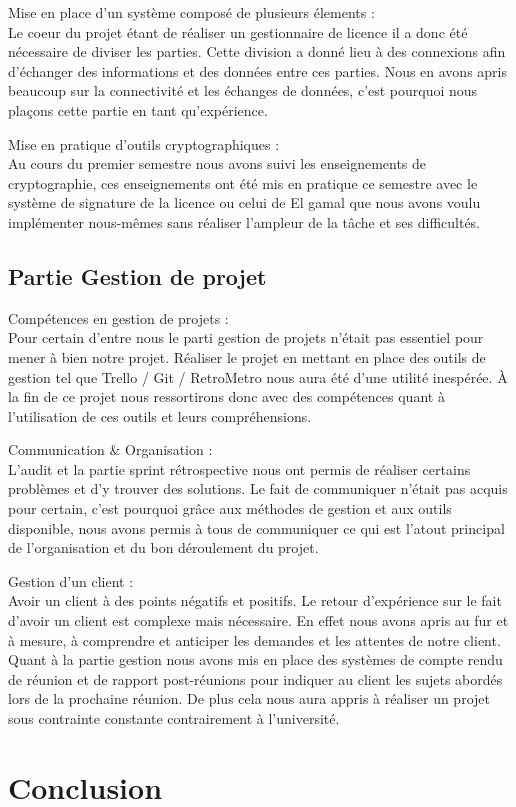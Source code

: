      Mise en place d'un système composé de plusieurs élements :\\
     \newline
     Le coeur du projet étant de réaliser un gestionnaire de licence il a donc été nécessaire de diviser les parties. 
     Cette division a donné lieu à des connexions afin d'échanger des informations et des données entre ces parties. 
     Nous en avons apris beaucoup sur la connectivité et les échanges de données, c'est pourquoi nous plaçons cette partie en tant  qu'expérience.
     \newline
    
     Mise en pratique d'outils cryptographiques :\\
     \newline
     Au cours du premier semestre nous avons suivi les enseignements de cryptographie, ces enseignements ont été mis en pratique ce semestre avec le système de signature de la licence ou celui de 
     El gamal que nous avons voulu implémenter nous-mêmes sans réaliser l'ampleur de la tâche et ses difficultés.
     \newline
     \newpage
\section{Partie Gestion de projet}
    Compétences en gestion de projets : \\
    \newline
    Pour certain d'entre nous le parti gestion de projets n'était pas essentiel pour mener à bien notre projet. Réaliser le projet en 
    mettant en place des outils de gestion tel que Trello / Git / RetroMetro nous aura été d'une utilité inespérée. 
    À la fin de ce projet nous ressortirons donc avec des compétences quant à l'utilisation de ces outils et leurs compréhensions.
    \newline

    Communication \& Organisation : \\
    \newline
    L'audit et la partie sprint rétrospective nous ont permis de réaliser certains problèmes et d'y trouver des solutions. Le fait de communiquer 
    n'était pas acquis pour certain, c'est pourquoi grâce aux méthodes de gestion et aux outils disponible, nous avons permis à tous de communiquer 
    ce qui est l'atout principal de l'organisation et du bon déroulement du projet.
    \newline

    Gestion d'un client :\\
    \newline
    Avoir un client à des points négatifs et positifs. Le retour d'expérience sur le fait d'avoir un client est complexe mais nécessaire. En effet nous avons apris au fur et 
    à mesure, à comprendre et anticiper les demandes et les attentes de notre client. Quant à la partie gestion nous avons mis en place des systèmes de compte rendu de réunion et de rapport post-réunions pour indiquer au client les sujets abordés lors 
    de la prochaine réunion. De plus cela nous aura appris à réaliser un projet sous contrainte constante contrairement à l'université.
\chapter{Conclusion}
\label{chapter:bilan}

